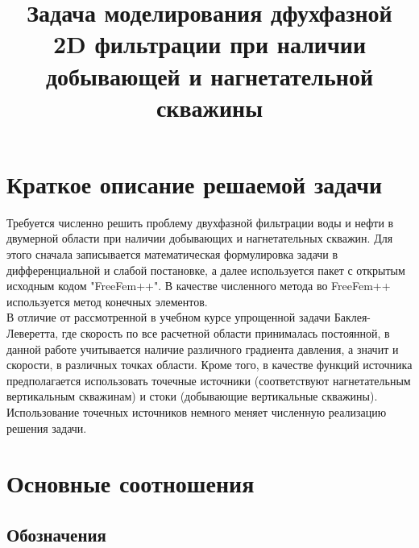 


\title{Задача моделирования дфухфазной 2D фильтрации при наличии добывающей и нагнетательной скважины}


\maketitle



\section{Краткое описание решаемой задачи}

Требуется численно решить проблему двухфазной фильтрации воды и нефти в двумерной области при 
наличии добывающих и нагнетательных скважин. Для этого сначала записывается математическая 
формулировка задачи в дифференциальной и слабой постановке,
а далее используется пакет с открытым исходным кодом "FreeFem++". В качестве численного
метода во FreeFem++ используется метод конечных элементов.\\
В отличие от рассмотренной в учебном курсе упрощенной задачи Баклея-Леверетта, где скорость по
все расчетной области принималась постоянной, в данной работе учитывается 
наличие различного градиента давления, а значит и скорости, в различных точках области. Кроме того, в качестве
функций источника предполагается использовать точечные источники (соответствуют нагнетательным
вертикальным скважинам) и стоки (добывающие вертикальные скважины). Использование точечных 
источников немного меняет численную реализацию решения задачи.

\section{Основные соотношения}

\subsection{Обозначения}

